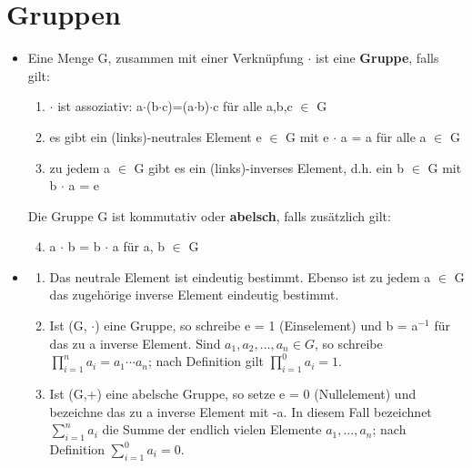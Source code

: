 %


\section{Gruppen}
\begin{itemize}
\item Eine Menge G, zusammen mit einer Verknüpfung $\cdot$ ist eine \textbf{Gruppe}, falls gilt:
\begin{enumerate}
\item $\cdot$ ist assoziativ: a$\cdot$(b$\cdot$c)=(a$\cdot$b)$\cdot$c für alle a,b,c $\in$ G
\item es gibt ein (links)-neutrales Element e $\in$ G mit e $\cdot$ a = a für alle a $\in$ G 
\item zu jedem a $\in$ G gibt es ein (links)-inverses Element, d.h. ein b $\in$ G mit b $\cdot$ a = e
\end{enumerate}
Die Gruppe G ist kommutativ oder \textbf{abelsch}, falls zusätzlich gilt:
\begin{enumerate}
\setcounter{enumi}{3}
\item a $\cdot$ b = b $\cdot$ a für a, b $\in$ G
\end{enumerate}
\item 
\begin{remark}
\begin{enumerate}
\item Das neutrale Element ist eindeutig bestimmt. Ebenso ist zu jedem a $\in$ G das zugehörige inverse Element eindeutig bestimmt.
\item Ist (G, $\cdot$) eine Gruppe, so schreibe e = 1 (Einselement) und b = a$^{-1}$ für das zu a inverse Element. Sind $a_1, a_2, . . . , a_n \in G$, so schreibe $\prod\nolimits_{i=1}^{n} a_i = a_1 \cdots a_n$; nach Definition gilt $\prod\nolimits_{i=1}^{0}a_i = 1$.
\item Ist (G,+) eine abelsche Gruppe, so setze e = 0 (Nullelement) und bezeichne das zu a inverse Element mit -a. In diesem Fall bezeichnet $\sum\nolimits_{i=1}^{n} a_i$ die Summe der endlich vielen Elemente $a_1, . . . , a_n$; nach Definition $\sum\nolimits_{i=1}^{0} a_i = 0$.
\end{enumerate}
\end{remark}

\end{itemize}
